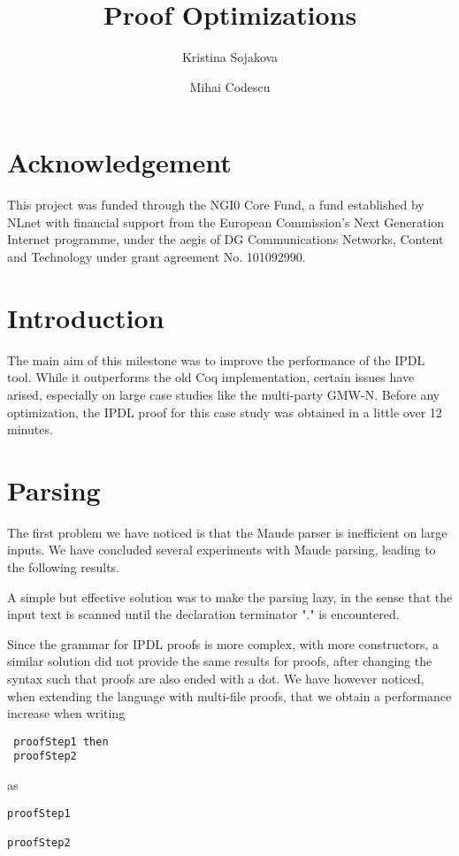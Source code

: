 \documentclass{article}
\title{Proof Optimizations}
\author{Kristina Sojakova \and Mihai Codescu}
\date{}
\begin{document}
\maketitle
\section*{\small Acknowledgement}
This project was funded through the NGI0 Core Fund, a fund established by NLnet with financial support from the European Commission's Next Generation Internet programme, under the aegis of DG Communications Networks, Content and Technology under grant agreement No. 101092990.

\section{Introduction}

The main aim of this milestone was to improve the performance of the IPDL tool.
While it outperforms the old Coq implementation, certain issues have arised,
especially on large case studies like the multi-party GMW-N. Before any
optimization, the IPDL proof for this case study was obtained in a little over 
12 minutes.

\section{Parsing}

The first problem we have noticed is that the Maude parser is inefficient on
large inputs. We have concluded several experiments with Maude parsing, leading to the following results.

A simple but effective solution was to make the parsing lazy, in the sense that
the input text is scanned until the declaration terminator "." is encountered.

Since the grammar for IPDL proofs is more complex, with more 
constructors, a similar solution did not 
provide the same results for proofs, after changing the syntax such that
proofs are also ended with a dot. We have however noticed,
when extending the language with multi-file proofs, that we obtain a
performance increase when writing 
\begin{verbatim} 
 proofStep1 then 
 proofStep2
\end{verbatim} 
as 
\begin{verbatim}
proofStep1

proofStep2
\end{verbatim} 
\end{document}
